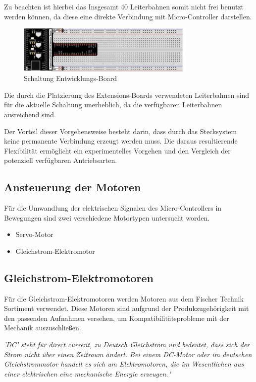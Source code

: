 \documentclass[conference,compsoc,final,a4paper]{IEEEtran}
\begin{document}
Zu beachten ist hierbei das Insgesamt 40 Leiterbahnen somit nicht frei benutzt werden können, da diese eine direkte Verbindung mit Micro-Controller darstellen.
\begin{figure}[h]
\centering
\includegraphics[width=8.5cm]{../images/ext_board.png}
\caption{Schaltung Entwicklungs-Board}
\label{Elektrik:DevBoardInternal}
\end{figure}

Die durch die Platzierung des Extensions-Boards verwendeten Leiterbahnen sind für die aktuelle Schaltung unerheblich, da die verfügbaren Leiterbahnen ausreichend sind.

Der Vorteil dieser Vorgehensweise besteht darin, dass durch das Stecksystem keine permanente Verbindung erzeugt werden muss. 
Die daraus resultierende Flexibilität ermöglicht ein experimentelles Vorgehen und den Vergleich der potenziell verfügbaren Antriebsarten.

\subsection{Ansteuerung der Motoren}
Für die Umwandlung der elektrischen Signalen des Micro-Controllers in Bewegungen sind zwei verschiedene Motortypen untersucht worden.

\begin{itemize}
	\item Servo-Motor
	\item Gleichstrom-Elektromotor
\end{itemize}

\subsection{Gleichstrom-Elektromotoren}

Für die Gleichstrom-Elektromotoren werden Motoren aus dem Fischer Technik Sortiment verwendet. 
Diese Motoren sind aufgrund der Produkzugehörigkeit mit den passenden Aufnahmen versehen, um Kompatibilitätsprobleme mit der Mechanik auszuschließen.

\textit{’DC’ steht für direct current, zu Deutsch Gleichstrom und bedeutet, dass sich der Strom nicht über einen Zeitraum ändert. Bei einem DC-Motor oder im deutschen Gleichstrommotor handelt es sich um Elektromotoren, die im Wesentlichen aus
einer elektrischen eine mechanische Energie erzeugen." } \autocite{metzgerkonzepte}
\end{document}

